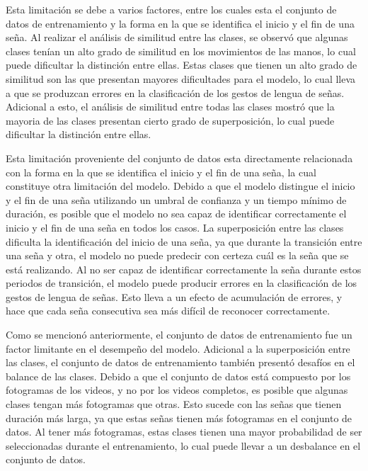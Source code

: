 Esta limitación se debe a varios factores, entre los cuales esta el conjunto de datos de entrenamiento y la forma en la que se identifica el inicio y el fin de una seña.
Al realizar el análisis de similitud entre las clases, se observó que algunas clases tenían un alto grado de similitud en los movimientos de las manos, lo cual puede dificultar la distinción entre ellas.
Estas clases que tienen un alto grado de similitud son las que presentan mayores dificultades para el modelo, lo cual lleva a que se produzcan errores en la clasificación de los gestos de lengua de señas.
Adicional a esto, el análisis de similitud entre todas las clases mostró que la mayoria de las clases presentan cierto grado de superposición, lo cual puede dificultar la distinción entre ellas.

Esta limitación proveniente del conjunto de datos esta directamente relacionada con la forma en la que se identifica el inicio y el fin de una seña, la cual constituye otra limitación del modelo.
Debido a que el modelo distingue el inicio y el fin de una seña utilizando un umbral de confianza y un tiempo mínimo de duración, es posible que el modelo no sea capaz de identificar correctamente el inicio y el fin de una seña en todos los casos.
La superposición entre las clases dificulta la identificación del inicio de una seña, ya que durante la transición entre una seña y otra, el modelo no puede predecir con certeza cuál es la seña que se está realizando.
Al no ser capaz de identificar correctamente la seña durante estos periodos de transición, el modelo puede producir errores en la clasificación de los gestos de lengua de señas.
Esto lleva a un efecto de acumulación de errores, y hace que cada seña consecutiva sea más difícil de reconocer correctamente.

Como se mencionó anteriormente, el conjunto de datos de entrenamiento fue un factor limitante en el desempeño del modelo.
Adicional a la superposición entre las clases, el conjunto de datos de entrenamiento también presentó desafíos en el balance de las clases.
Debido a que el conjunto de datos está compuesto por los fotogramas de los videos, y no por los videos completos, es posible que algunas clases tengan más fotogramas que otras.
Esto sucede con las señas que tienen duración más larga, ya que estas señas tienen más fotogramas en el conjunto de datos.
Al tener más fotogramas, estas clases tienen una mayor probabilidad de ser seleccionadas durante el entrenamiento, lo cual puede llevar a un desbalance en el conjunto de datos.

